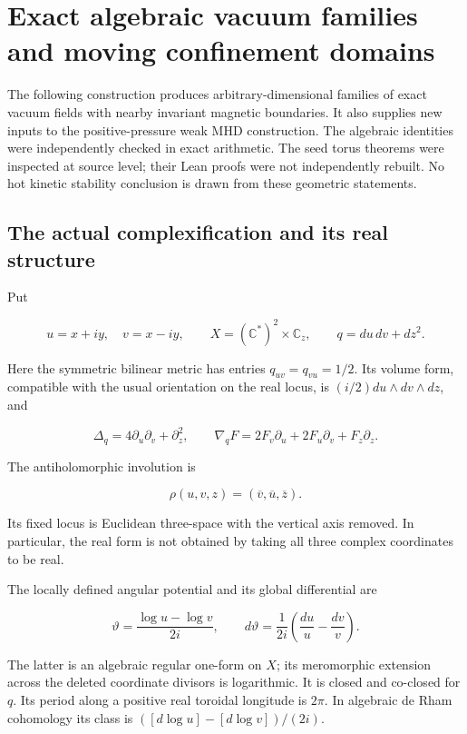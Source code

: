 \section{Exact algebraic vacuum families and moving confinement domains}\label{exact-algebraic-vacuum-families-and-moving-confinement-domains}

The following construction produces arbitrary-dimensional families of exact vacuum fields with nearby invariant magnetic boundaries. It also supplies new inputs to the positive-pressure weak MHD construction. The algebraic identities were independently checked in exact arithmetic. The seed torus theorems were inspected at source level; their Lean proofs were not independently rebuilt. No hot kinetic stability conclusion is drawn from these geometric statements.

\subsection{The actual complexification and its real structure}\label{the-actual-complexification-and-its-real-structure}

Put

\[
u=x+iy,\quad v=x-iy,\qquad
X=(\mathbb C^*)^2\times\mathbb C_z,
\qquad q=du\,dv+dz^2.
\]

Here the symmetric bilinear metric has entries \(q_{uv}=q_{vu}=1/2\). Its volume form, compatible with the usual orientation on the real locus, is \((i/2)du\wedge dv\wedge dz\), and

\[
\Delta_q=4\partial_u\partial_v+\partial_z^2,
\qquad \nabla_q F=2F_v\partial_u+2F_u\partial_v+F_z\partial_z.
\]

The antiholomorphic involution is

\[
\rho(u,v,z)=(\overline v,\overline u,\overline z).
\]

Its fixed locus is Euclidean three-space with the vertical axis removed. In particular, the real form is not obtained by taking all three complex coordinates to be real.

The locally defined angular potential and its global differential are

\[
\vartheta=\frac{\log u-\log v}{2i},\qquad
d\vartheta=\frac1{2i}\left(\frac{du}{u}-\frac{dv}{v}\right).
\]

The latter is an algebraic regular one-form on \(X\); its meromorphic extension across the deleted coordinate divisors is logarithmic. It is closed and co-closed for \(q\). Its period along a positive real toroidal longitude is \(2\pi\). In algebraic de Rham cohomology its class is \(([d\log u]-[d\log v])/(2i)\).


